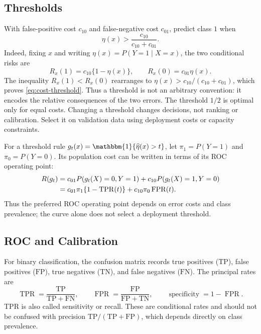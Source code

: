 \documentclass[12pt,oneside]{book}
\numberwithin{equation}{section}
\theoremstyle{definition}
\theoremstyle{plain}
\theoremstyle{remark}
\newcommand{\ind}{\mathbbm{1}}
\begin{document}
\subsection{Thresholds}

With false-positive cost $c_{10}$ and false-negative cost $c_{01}$, predict
class $1$ when
\begin{equation}
    \eta(x)>\frac{c_{10}}{c_{10}+c_{01}}.
    \label{eq:cost-threshold}
\end{equation}
Indeed, fixing $x$ and writing $\eta(x)=P(Y=1\mid X=x)$, the two conditional
risks are
\[
 R_x(1)=c_{10}\{1-\eta(x)\},\qquad
 R_x(0)=c_{01}\eta(x).
\]
The inequality $R_x(1)<R_x(0)$ rearranges to
$\eta(x)>c_{10}/(c_{10}+c_{01})$, which proves
\cref{eq:cost-threshold}. Thus a threshold is not an arbitrary convention: it
encodes the relative consequences of the two errors.
The threshold $1/2$ is optimal only for equal costs. Changing a threshold
changes decisions, not ranking or calibration. Select it on validation data
using deployment costs or capacity constraints.

For a threshold rule $g_t(x)=\ind\{\widehat\eta(x)>t\}$, let
$\pi_1=P(Y=1)$ and $\pi_0=P(Y=0)$. Its population cost can be written in terms
of its ROC operating point:
\begin{align}
 R(g_t)
 &=c_{01}P(g_t(X)=0,Y=1)+c_{10}P(g_t(X)=1,Y=0)\notag\\
 &=c_{01}\pi_1\{1-\operatorname{TPR}(t)\}
   +c_{10}\pi_0\operatorname{FPR}(t).
 \label{eq:roc-operating-risk}
\end{align}
Thus the preferred ROC operating point depends on error costs and class
prevalence; the curve alone does not select a deployment threshold.

\subsection{ROC and Calibration}

For binary classification, the confusion matrix records true positives
($\mathrm{TP}$), false positives ($\mathrm{FP}$), true negatives
($\mathrm{TN}$), and false negatives ($\mathrm{FN}$). The principal rates are
\[
 \operatorname{TPR}=\frac{\mathrm{TP}}{\mathrm{TP}+\mathrm{FN}},\qquad
 \operatorname{FPR}=\frac{\mathrm{FP}}{\mathrm{FP}+\mathrm{TN}},\qquad
 \operatorname{specificity}=1-\operatorname{FPR}.
\]
TPR is also called sensitivity or recall. These are conditional rates and
should not be confused with precision
$\mathrm{TP}/(\mathrm{TP}+\mathrm{FP})$, which depends directly on class
prevalence.
\end{document}

